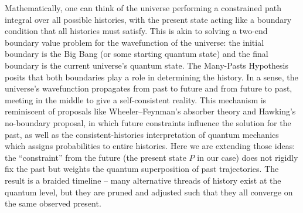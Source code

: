 \documentclass[11pt]{article}
\begin{document}
Mathematically, one can think of the universe performing a constrained path integral over all possible histories, with the present state acting like a boundary condition that all histories must satisfy. This is akin to solving a two-end boundary value problem for the wavefunction of the universe: the initial boundary is the Big Bang (or some starting quantum state) and the final boundary is the current universe’s quantum state. The Many-Pasts Hypothesis posits that both boundaries play a role in determining the history. In a sense, the universe’s wavefunction propagates from past to future and from future to past, meeting in the middle to give a self-consistent reality. This mechanism is reminiscent of proposals like Wheeler–Feynman’s absorber theory and Hawking’s no-boundary proposal, in which future constraints influence the solution for the past, as well as the consistent-histories interpretation of quantum mechanics which assigns probabilities to entire histories. Here we are extending those ideas: the “constraint” from the future (the present state $P$ in our case) does not rigidly fix the past but weights the quantum superposition of past trajectories. The result is a braided timeline – many alternative threads of history exist at the quantum level, but they are pruned and adjusted such that they all converge on the same observed present.
\end{document}
